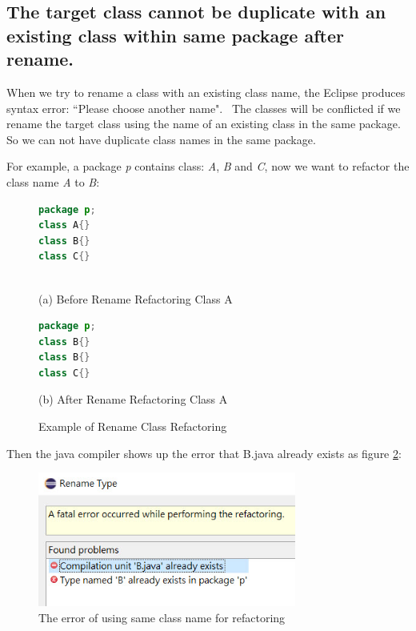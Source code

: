 \subsection{The target class cannot be duplicate with an existing class within same package after rename.}

When we try to rename a class with an existing class name, the Eclipse produces syntax error:
``Please choose another name".~\cite{EclipseWebPage} The classes will be conflicted if we rename the target class using the name of an existing class in the same package. So we can not have duplicate class names in the same package. 

For example, a package \textsl{p} contains class: \textsl{A}, \textsl{B} and \textsl{C}, now we want to refactor the class name \textsl{A} to \textsl{B}:

\begin{figure}[th]
\centering
\begin{minipage}[t]{0.45\linewidth}
\begin{lstlisting}[language=java, basicstyle=\scriptsize\ttfamily,frame=single]
package p;
class A{}	
class B{}
class C{}
 
\end{lstlisting}
\tiny{(a) Before Rename Refactoring Class A}
\end{minipage}
\hfill
\begin{minipage}[t]{0.45\linewidth}
\begin{lstlisting}[language=java, basicstyle=\scriptsize\ttfamily,frame=single]
package p;
class B{}	
class B{}
class C{}

\end{lstlisting}
\tiny{(b) After Rename Refactoring Class A}
\end{minipage}
\caption{Example of Rename Class Refactoring}
\label{fig:afterrr}
\end{figure}

Then the java compiler shows up the error that B.java already exists as figure \ref{fig:renameclassname}:

\begin{figure}[H]
\centerline{\includegraphics[width=85mm,scale=0.5]{SCN.jpg}}
\caption{The error of using same class name for refactoring}
\label{fig:renameclassname}
\end{figure}

